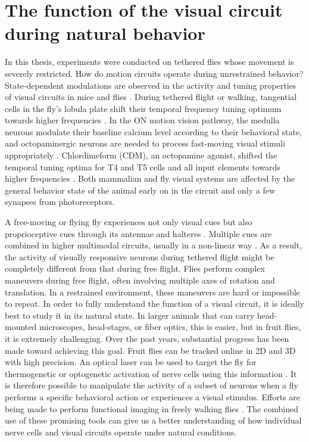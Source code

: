 \section{The function of the visual circuit during natural behavior}
In this thesis, experiments were conducted on tethered flies whose movement is severely restricted. How do motion circuits operate during unrestrained behavior? State-dependent modulations are observed in the activity and tuning properties of visual circuits in mice and flies \parencite{Maimon2011}. During tethered flight or walking, tangential cells in the fly's lobula plate shift their temporal frequency tuning optimum towards higher frequencies \parencite{Chiappe2010, Maimon2010, Jung2011}. In the ON motion vision pathway, the medulla neurons modulate their baseline calcium level according to their behavioral state, and octopaminergic neurons are needed to process fast-moving visual stimuli appropriately \parencite{Strother2018}. Chlordimeform (CDM), an octopamine agonist, shifted the temporal tuning optima for T4 and T5 cells and all input elements towards higher frequencies \parencite{Arenz2017}. Both mammalian and fly visual systems are affected by the general behavior state of the animal early on in the circuit and only a few synapses from photoreceptors.

A free-moving or flying fly experiences not only visual cues but also proprioceptive cues through its antennae and halteres \parencite{Mamiya2011, Sandeman1980}. Multiple cues are combined in higher multimodal circuits, usually in a non-linear way \parencite{Haag2010, Huston2009}. As a result, the activity of visually responsive neurons during tethered flight might be completely different from that during free flight. Flies perform complex maneuvers during free flight, often involving multiple axes of rotation and translation. In a restrained environment, these maneuvers are hard or impossible to repeat. In order to fully understand the function of a visual circuit, it is ideally best to study it in its natural state. In larger animals that can carry head-mounted microscopes, head-stages, or fiber optics, this is easier, but in fruit flies, it is extremely challenging. Over the past years, substantial progress has been made toward achieving this goal. Fruit flies can be tracked online in 2D and 3D with high precision. An optical laser can be used to target the fly for thermogenetic or optogenetic activation of nerve cells using this information \parencite{Bath2014, Stowers2014, Straw2011}. It is therefore possible to manipulate the activity of a subset of neurons when a fly performs a specific behavioral action or experiences a visual stimulus. Efforts are being made to perform functional imaging in freely walking flies \parencite{Grover2016}. The combined use of these promising tools can give us a better understanding of how individual nerve cells and visual circuits operate under natural conditions.

